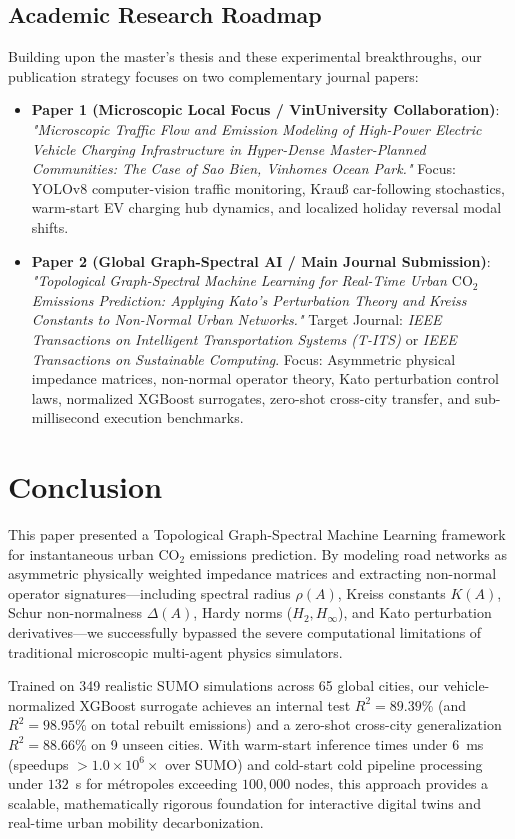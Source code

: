 \documentclass[lettersize,journal]{IEEEtran}
\begin{document}
\subsection{Academic Research Roadmap}
Building upon the master's thesis and these experimental breakthroughs, our publication strategy focuses on two complementary journal papers:
\begin{itemize}
    \item \textbf{Paper 1 (Microscopic Local Focus / VinUniversity Collaboration)}: 
    \textit{"Microscopic Traffic Flow and Emission Modeling of High-Power Electric Vehicle Charging Infrastructure in Hyper-Dense Master-Planned Communities: The Case of Sao Bien, Vinhomes Ocean Park."}
    Focus: YOLOv8 computer-vision traffic monitoring, Krauß car-following stochastics, warm-start EV charging hub dynamics, and localized holiday reversal modal shifts.
    \item \textbf{Paper 2 (Global Graph-Spectral AI / Main Journal Submission)}: 
    \textit{"Topological Graph-Spectral Machine Learning for Real-Time Urban $\text{CO}_2$ Emissions Prediction: Applying Kato's Perturbation Theory and Kreiss Constants to Non-Normal Urban Networks."}
    Target Journal: \emph{IEEE Transactions on Intelligent Transportation Systems (T-ITS)} or \emph{IEEE Transactions on Sustainable Computing}. Focus: Asymmetric physical impedance matrices, non-normal operator theory, Kato perturbation control laws, normalized XGBoost surrogates, zero-shot cross-city transfer, and sub-millisecond execution benchmarks.
\end{itemize}

\section{Conclusion}
This paper presented a Topological Graph-Spectral Machine Learning framework for instantaneous urban $\text{CO}_2$ emissions prediction. By modeling road networks as asymmetric physically weighted impedance matrices and extracting non-normal operator signatures—including spectral radius $\rho(A)$, Kreiss constants $K(A)$, Schur non-normalness $\Delta(A)$, Hardy norms ($H_2, H_\infty$), and Kato perturbation derivatives—we successfully bypassed the severe computational limitations of traditional microscopic multi-agent physics simulators. 

Trained on 349 realistic SUMO simulations across 65 global cities, our vehicle-normalized XGBoost surrogate achieves an internal test $R^2 = 89.39\%$ (and $R^2 = 98.95\%$ on total rebuilt emissions) and a zero-shot cross-city generalization $R^2 = 88.66\%$ on 9 unseen cities. With warm-start inference times under $6$~ms (speedups $>1.0 \times 10^6 \times$ over SUMO) and cold-start cold pipeline processing under $132$~s for métropoles exceeding $100,000$ nodes, this approach provides a scalable, mathematically rigorous foundation for interactive digital twins and real-time urban mobility decarbonization.
\end{document}
